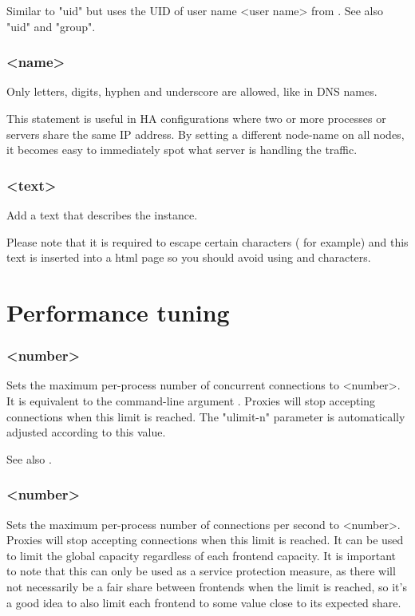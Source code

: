 Similar to "uid" but uses the UID of user name <user name> from .
See also "uid" and "group".

\subsubsection[node]{ <name>}

Only letters, digits, hyphen and underscore are allowed, like in DNS names.

This statement is useful in HA configurations where two or more processes or
servers share the same IP address. By setting a different node-name on all
nodes, it becomes easy to immediately spot what server is handling the
traffic.

\subsubsection[description]{ <text>}

Add a text that describes the instance.

Please note that it is required to escape certain characters (\chr{\#} for example)
and this text is inserted into a html page so you should avoid using
\chr{<} and \chr{>} characters.

\section{Performance tuning}
\label{sec:performance}

\subsubsection[maxconn]{ <number>}

Sets the maximum per-process number of concurrent connections to <number>. It
is equivalent to the command-line argument . Proxies will stop accepting
connections when this limit is reached. The "ulimit-n" parameter is
automatically adjusted according to this value.

See also .

\subsubsection[maxconnrate]{ <number>}

Sets the maximum per-process number of connections per second to <number>.
Proxies will stop accepting connections when this limit is reached. It can be
used to limit the global capacity regardless of each frontend capacity. It is
important to note that this can only be used as a service protection measure,
as there will not necessarily be a fair share between frontends when the
limit is reached, so it's a good idea to also limit each frontend to some
value close to its expected share.

